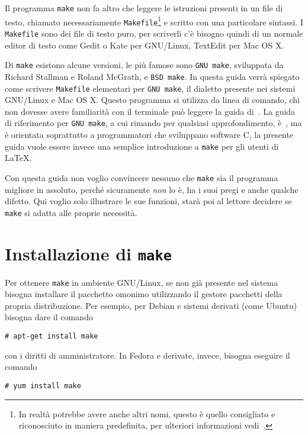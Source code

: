 Il programma \texttt{make} non fa altro che leggere le istruzioni presenti in un
file di testo, chiamato necessariamente
\texttt{Makefile}\footnote{In realtà potrebbe avere anche altri nomi, questo è
  quello consigliato e riconosciuto in maniera predefinita, per ulteriori
  informazioni vedi~\textcite[12]{gnu:make}.}
e scritto con una particolare sintassi.  I \texttt{Makefile} sono dei file di
testo puro, per scriverli c'è bisogno quindi di un normale editor di testo come
Gedit o Kate per GNU/Linux, TextEdit per Mac OS X.

Di \texttt{make} esistono alcune versioni, le più famose sono \texttt{GNU make},
sviluppata da Richard Stallman e Roland McGrath, e \texttt{BSD make}.  In questa
guida verrà spiegato come scrivere \texttt{Makefile} elementari per
\texttt{GNU make}, il dialetto presente nei sistemi GNU/Linux e Mac OS X.
Questo programma si utilizza da linea di comando, chi non dovesse avere
familiarità con il terminale può leggere la guida
di~\textcite{giacomelli:console}.  La guida di riferimento per
\texttt{GNU make}, a cui rimando per qualsiasi approfondimento,
è~\textcite{gnu:make}, ma è orientata soprattutto a programmatori che sviluppano
software C, la presente guida vuole essere invece una semplice introduzione a
\texttt{make} per gli utenti di \LaTeX{}.

Con questa guida non voglio convincere nessuno che \texttt{make} sia il
programma migliore in assoluto, perché sicuramente \emph{non} lo è, ha i suoi
pregi e anche qualche difetto.  Qui voglio solo illustrare le sue funzioni,
starà poi al lettore decidere se \texttt{make} si adatta alle proprie necessità.

\section{Installazione di \texttt{make}}
\label{sec:installazione}

Per ottenere \texttt{make} in ambiente GNU/Linux, se non già presente nel
sistema bisogna installare il pacchetto omonimo utilizzando il gestore pacchetti
della propria distribuzione.  Per esempio, per Debian e sistemi derivati (come
Ubuntu) bisogna dare il comando
\begin{verbatim}
# apt-get install make
\end{verbatim}
con i diritti di amministratore.  In Fedora e derivate, invece, bisogna eseguire
il comando
\begin{verbatim}
# yum install make
\end{verbatim}

